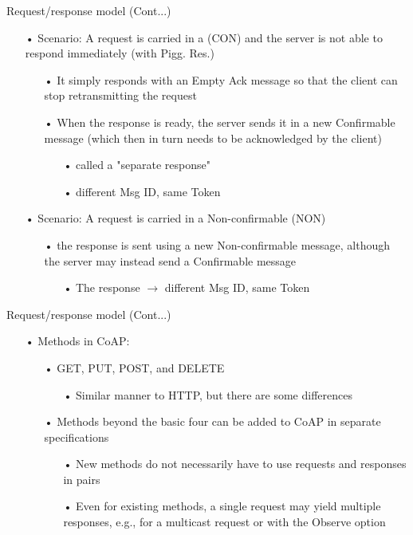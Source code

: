 \documentclass[11pt]{beamer}
\begin{document}
\begin{frame}{Request/response model (Cont...)}
\begin{itemize}
\item[•] Scenario: A request is carried in a (CON) and the server is not able to respond immediately (with Pigg. Res.)
\begin{itemize}
\item[•] It simply responds with an Empty Ack message so that the client can stop retransmitting the request
\item[•] When the response is ready, the server sends it in a new Confirmable message (which then in turn needs to be acknowledged by the client)
\begin{itemize}
\item[•] called a "separate response"
\item[•] different Msg ID, same Token
\end{itemize}
\end{itemize}
\item[•] Scenario: A request is carried in a Non-confirmable (NON)
\begin{itemize}
\item[•] the response is sent using a new Non-confirmable message, although the server may instead send a Confirmable message
\begin{itemize}
\item[•] The response $\rightarrow$ different Msg ID, same Token
\end{itemize}
\end{itemize}
\end{itemize}
\end{frame}
\begin{frame}{Request/response model (Cont...)}
\begin{itemize}
\item[•] Methods in CoAP:
\begin{itemize}
\item[•] GET, PUT, POST, and DELETE
\begin{itemize}
\item[•] Similar manner to HTTP, but there are some differences
\end{itemize}
\item[•] Methods beyond the basic four can be added to CoAP in separate specifications
\begin{itemize}
\item[•] New methods do not necessarily have to use requests and responses in pairs
\item[•] Even for existing methods, a single request may yield multiple responses, e.g., for a multicast request or with the Observe option
\end{itemize}
\end{itemize}
\end{itemize}
\end{frame}
\end{document}
